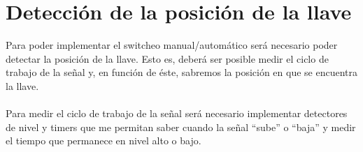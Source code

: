 \documentclass[main]{subfiles}
\begin{document}
\section{Detección de la posición de la llave}

Para poder implementar el switcheo manual/automático será necesario poder detectar la posición de la llave. Esto es, deberá ser posible medir el ciclo de trabajo de la señal y, en función de éste, sabremos la posición en que se encuentra la llave.\\
\\
Para medir el ciclo de trabajo de la señal será necesario implementar detectores de nivel y timers que me permitan saber cuando la señal ``sube'' o ``baja'' y medir el tiempo que permanece en nivel alto o bajo.
\end{document}
